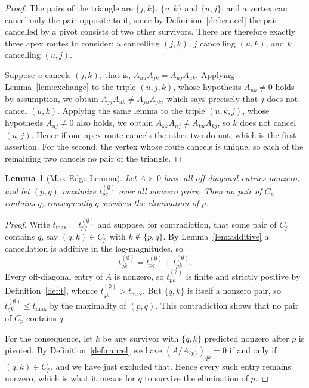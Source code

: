 \documentclass[11pt]{article}
\theoremstyle{plain}
\newtheorem{lemma}[theorem]{Lemma}
\theoremstyle{definition}
\theoremstyle{remark}
\begin{document}
\begin{humanblock}
\begin{proof}
The pairs of the triangle are $\{j,k\}$, $\{u,k\}$ and $\{u,j\}$, and a vertex can cancel only the pair
opposite to it, since by Definition~\ref{def:cancel} the pair cancelled by a pivot consists of two
other survivors. There are therefore exactly three apex routes to consider: $u$ cancelling $(j,k)$,
$j$ cancelling $(u,k)$, and $k$ cancelling $(u,j)$.

Suppose $u$ cancels $(j,k)$, that is, $A_{uu}A_{jk}=A_{uj}A_{uk}$. Applying
Lemma~\ref{lem:exchange} to the triple $(u,j,k)$, whose hypothesis $A_{uk}\neq0$ holds by assumption,
we obtain $A_{jj}A_{uk}\neq A_{ju}A_{jk}$, which says precisely that $j$ does not cancel $(u,k)$.
Applying the same lemma to the triple $(u,k,j)$, whose hypothesis $A_{uj}\neq0$ also holds, we obtain
$A_{kk}A_{uj}\neq A_{ku}A_{kj}$, so $k$ does not cancel $(u,j)$. Hence if one apex route cancels the
other two do not, which is the first assertion. For the second, the vertex whose route cancels is
unique, so each of the remaining two cancels no pair of the triangle.
\end{proof}

\begin{lemma}[Max-Edge Lemma]\label{lem:maxedge}
Let $A\succ0$ have all off-diagonal entries nonzero, and let $(p,q)$ maximize $t^{(\emptyset)}_{pq}$
over all nonzero pairs. Then no pair of $C_p$ contains $q$; consequently $q$ survives the elimination
of $p$.
\end{lemma}

\begin{proof}
Write $t_{\max}=t^{(\emptyset)}_{pq}$ and suppose, for contradiction, that some pair of $C_p$ contains
$q$, say $(q,k)\in C_p$ with $k\notin\{p,q\}$. By Lemma~\ref{lem:additive} a cancellation is additive
in the log-magnitudes, so
\[
  t^{(\emptyset)}_{qk}=t^{(\emptyset)}_{pq}+t^{(\emptyset)}_{pk}.
\]
Every off-diagonal entry of $A$ is nonzero, so $t^{(\emptyset)}_{pk}$ is finite and strictly positive
by Definition~\ref{def:t}, whence $t^{(\emptyset)}_{qk}>t_{\max}$. But $\{q,k\}$ is itself a nonzero
pair, so $t^{(\emptyset)}_{qk}\le t_{\max}$ by the maximality of $(p,q)$. This contradiction shows
that no pair of $C_p$ contains $q$.

For the consequence, let $k$ be any survivor with $\{q,k\}$ predicted nonzero after $p$ is pivoted. By
Definition~\ref{def:cancel} we have $(A/A_{\{p\}})_{qk}=0$ if and only if $(q,k)\in C_p$, and we have
just excluded that. Hence every such entry remains nonzero, which is what it means for $q$ to survive
the elimination of $p$.
\end{proof}


\end{humanblock}
\end{document}
